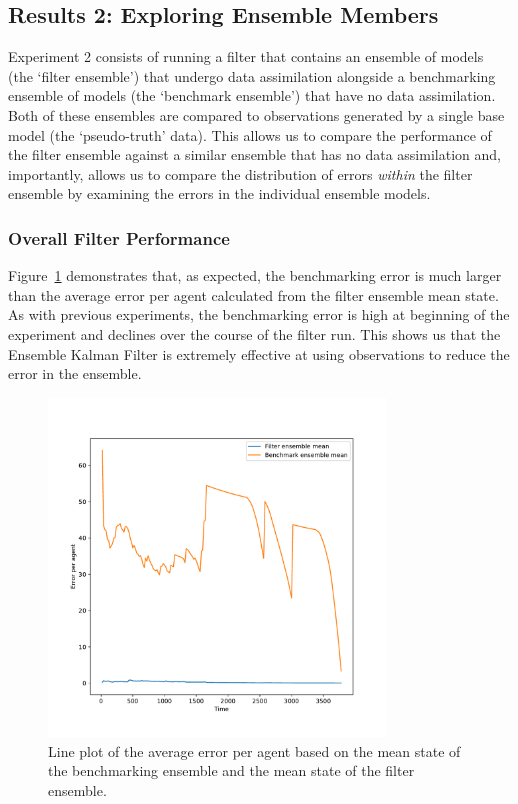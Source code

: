 \documentclass{article}
\begin{document}
\subsection{Results 2: Exploring Ensemble Members}

Experiment 2 consists of running a filter that contains an ensemble of models (the `filter ensemble') that undergo data assimilation alongside a benchmarking ensemble of models (the `benchmark ensemble') that have no data assimilation. Both of these ensembles are compared to observations generated by a single base model (the `pseudo-truth' data). This allows us to compare the performance of the filter ensemble against a similar ensemble that has no data assimilation and, importantly, allows us to compare the distribution of errors \textit{within} the filter ensemble by examining the errors in the individual ensemble models.

\subsubsection*{Overall Filter Performance}

Figure~\ref{fig:gcs_line_benchmark} demonstrates that, as expected, the benchmarking error is much larger than the average error per agent calculated from the filter ensemble mean state.  As with previous experiments, the benchmarking error is high at beginning of the experiment and declines over the course of the filter run.
This shows us that the Ensemble Kalman Filter is extremely effective at using observations to reduce the error in the ensemble.

\begin{figure}[ht]
	\centering
	\includegraphics[width=0.8\textwidth]{figures/exp1/benchmark.pdf}
	\caption{Line plot of the average error per agent based on the mean state of
		the benchmarking ensemble and the mean state of the filter
		ensemble.}\label{fig:gcs_line_benchmark}
\end{figure}
\end{document}
